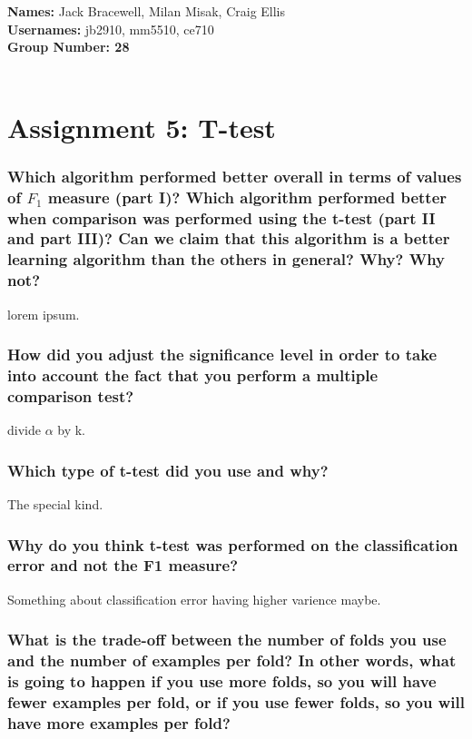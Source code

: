 \documentclass[12pt]{article}
\begin{document}
{\bf Names:} Jack Bracewell, Milan Misak, Craig Ellis \\
{\bf Usernames:} jb2910, mm5510, ce710 \\
{\bf Group Number: 28}  \\ \\

\section*{Assignment 5: T-test}

\subsubsection*{Which algorithm performed better overall in terms of values of $F_1$ measure (part I)? Which algorithm performed better when comparison was performed using the t-test (part II and part III)? Can we claim that this algorithm is a better learning algorithm than the others in general? Why? Why not?}

lorem ipsum.

\subsubsection*{How did you adjust the significance level in order to take into account the fact that you perform a multiple comparison test?}

divide $\alpha$ by k.

\subsubsection*{Which type of t-test did you use and why?}

The special kind.

\subsubsection*{Why do you think t-test was performed on the classification error and not the F1 measure?}

Something about classification error having higher varience maybe.

\subsubsection*{What is the trade-off between the number of folds you use and the number of examples per fold? In other words, what is going to happen if you use more folds, so you will have fewer examples per fold, or if you use fewer folds, so you will have more examples per fold?}
\end{document}
